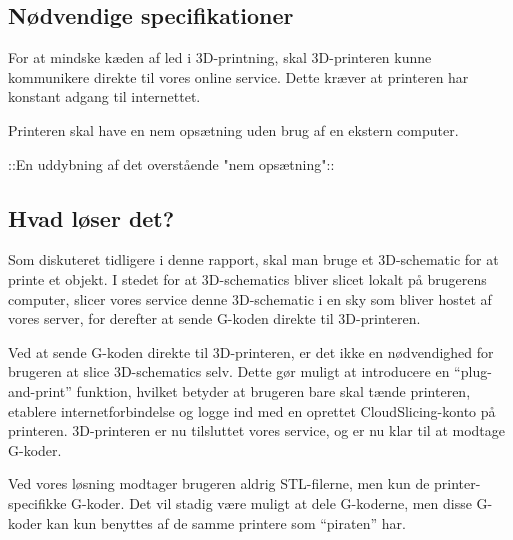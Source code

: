 


\subsection{Nødvendige specifikationer} %
\label{sub:krav_til_3d_teknologien}

For at mindske kæden af led i 3D-printning, skal 3D-printeren kunne kommunikere direkte til vores online service. Dette kræver at printeren har konstant adgang til internettet.

Printeren skal have en nem opsætning uden brug af en ekstern computer.

::En uddybning af det overstående "nem opsætning"::

\subsection{Hvad løser det?} %
\label{sub:hvad_l_ser_det_}

Som diskuteret tidligere i denne rapport, skal man bruge et 3D-schematic for at printe et objekt. I stedet for at 3D-schematics bliver slicet lokalt på brugerens computer, slicer vores service denne 3D-schematic i en sky som bliver hostet af vores server, for derefter at sende G-koden direkte til 3D-printeren. 

Ved at sende G-koden direkte til 3D-printeren, er det ikke en nødvendighed for brugeren at slice 3D-schematics selv. Dette gør muligt at introducere en ``plug-and-print'' funktion, hvilket betyder at brugeren bare skal tænde printeren, etablere internetforbindelse og logge ind med en oprettet CloudSlicing-konto på printeren. 3D-printeren er nu tilsluttet vores service, og er nu klar til at modtage G-koder.

Ved vores løsning modtager brugeren aldrig STL-filerne, men kun de printer-specifikke G-koder. Det vil stadig være muligt at dele G-koderne, men disse G-koder kan kun benyttes af de samme printere som ``piraten'' har.





